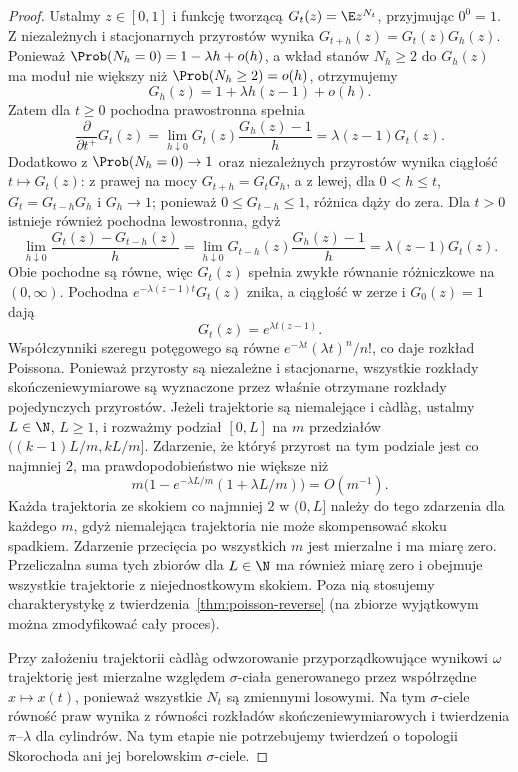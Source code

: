 \begin{proof}
Ustalmy $z\in[0,1]$ i funkcję tworzącą
$G_t(z)=\E z^{N_t}$, przyjmując $0^0=1$.
Z niezależnych i stacjonarnych przyrostów wynika
$G_{t+h}(z)=G_t(z)G_h(z)$. Ponieważ
$\Prob(N_h=0)=1-\lambda h+o(h)$, a wkład stanów
$N_h\ge2$ do $G_h(z)$ ma moduł nie większy niż
$\Prob(N_h\ge2)=o(h)$, otrzymujemy
\[
G_h(z)=1+\lambda h(z-1)+o(h).
\]
Zatem dla $t\ge0$ pochodna prawostronna spełnia
\[
\frac{\partial}{\partial t^+}G_t(z)
=\lim_{h\downarrow0}G_t(z)\frac{G_h(z)-1}{h}
=\lambda(z-1)G_t(z).
\]
Dodatkowo z $\Prob(N_h=0)\to1$ oraz niezależnych przyrostów
wynika ciągłość $t\mapsto G_t(z)$: z prawej na mocy
$G_{t+h}=G_tG_h$, a z lewej, dla $0<h\le t$,
$G_t=G_{t-h}G_h$ i $G_h\to1$; ponieważ
$0\le G_{t-h}\le1$, różnica dąży do zera.
Dla $t>0$ istnieje również pochodna lewostronna, gdyż
\[
\lim_{h\downarrow0}\frac{G_t(z)-G_{t-h}(z)}h
=\lim_{h\downarrow0}G_{t-h}(z)\frac{G_h(z)-1}h
=\lambda(z-1)G_t(z).
\]
Obie pochodne są równe, więc $G_t(z)$ spełnia zwykłe
równanie różniczkowe na $(0,\infty)$. Pochodna
$e^{-\lambda(z-1)t}G_t(z)$ znika, a ciągłość w zerze
i $G_0(z)=1$ dają
\[
G_t(z)=e^{\lambda t(z-1)}.
\]
Współczynniki szeregu potęgowego są równe
$e^{-\lambda t}(\lambda t)^n/n!$, co daje rozkład Poissona.
Ponieważ przyrosty są niezależne i stacjonarne,
wszystkie rozkłady skończeniewymiarowe są wyznaczone
przez właśnie otrzymane rozkłady pojedynczych przyrostów.
Jeżeli trajektorie są niemalejące i c\`adl\`ag, ustalmy
$L\in\N$, $L\ge1$, i rozważmy podział $[0,L]$
na $m$ przedziałów $( (k-1)L/m,kL/m]$.
Zdarzenie, że któryś przyrost na tym podziale jest
co najmniej $2$, ma prawdopodobieństwo nie większe niż
\[
m\bigl(1-e^{-\lambda L/m}(1+\lambda L/m)\bigr)
=O(m^{-1}).
\]
Każda trajektoria ze skokiem co najmniej $2$ w $(0,L]$
należy do tego zdarzenia dla każdego $m$, gdyż
niemalejąca trajektoria nie może skompensować skoku
spadkiem. Zdarzenie przecięcia po wszystkich $m$
jest mierzalne i ma miarę zero. Przeliczalna suma tych
zbiorów dla $L\in\N$ ma również miarę zero i obejmuje
wszystkie trajektorie z niejednostkowym skokiem.
Poza nią stosujemy charakterystykę z
twierdzenia~\ref{thm:poisson-reverse} (na zbiorze
wyjątkowym można zmodyfikować cały proces).

Przy założeniu trajektorii c\`adl\`ag odwzorowanie
przyporządkowujące wynikowi $\omega$ trajektorię
jest mierzalne względem $\sigma$-ciała
generowanego przez współrzędne $x\mapsto x(t)$,
ponieważ wszystkie $N_t$ są zmiennymi losowymi.
Na tym $\sigma$-ciele równość praw wynika z równości
rozkładów skończeniewymiarowych i twierdzenia
$\pi$--$\lambda$ dla cylindrów.
Na tym etapie nie potrzebujemy twierdzeń o topologii
Skorochoda ani jej borelowskim $\sigma$-ciele.
\end{proof}

